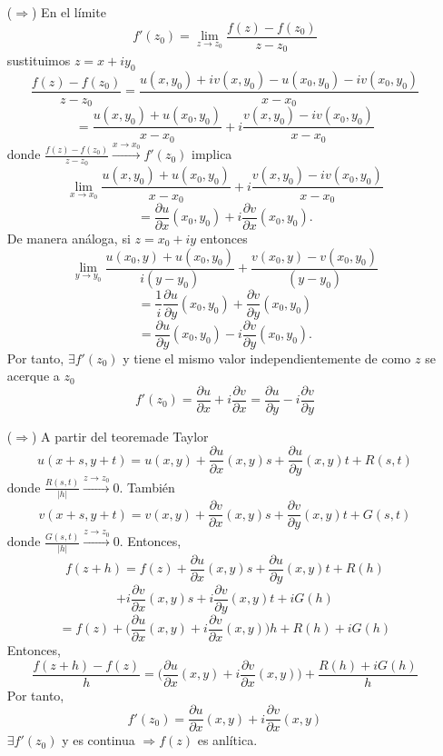 \begin{dem}
  \begin{enumerate}[label=(\roman*)]
    \item [($\Rightarrow$)] En el límite
      \[ 
        f'(z_{0}) = \lim_{z \to z_{0}} \frac{f(z) - f(z_{0})}{z - z_{0}}
      \] 
      sustituimos $z = x + iy_{0}$
      \[ 
        \frac{f(z) - f(z_{0})}{z - z_{0}} = \frac{u(x, y_{0}) + i v(x, y_{0}) - u(x_{0},y_{0}) - i v(x_{0}, y_{0})}{x - x_{0}}
      \]
      \[ 
      = \frac{u(x, y_{0}) +  u(x_{0}, y_{0})}{x - x_{0}} + i \frac{v(x,y_{0}) - i v(x_{0}, y_{0})}{x - x_{0}}
      \] 
      donde $\frac{f(z) - f(z_{0})}{z - z_{0}} \xrightarrow[]{x \rightarrow x_{0}} f'(z_{0})$ implica
      \[ 
        \lim_{x \to x_{0}} \frac{u(x, y_{0}) +  u(x_{0}, y_{0})}{x - x_{0}} + i \frac{v(x,y_{0}) - i v(x_{0}, y_{0})}{x - x_{0}} 
      \]
      \[ 
        = \frac{\partial{u}}{\partial{x}}(x_{0}, y_{0}) + i \frac{\partial{v}}{\partial{x}}(x_{0}, y_{0}).
      \] 
      De manera análoga, si $z = x_{0} + i y$ entonces
      \[ 
      \lim_{y \to y_{0}} \frac{u(x_{0}, y) +  u(x_{0}, y_{0})}{i(y - y_{0})} +  \frac{v(x_{0},y) -  v(x_{0}, y_{0})}{(y - y_{0})} 
      \]
      \[ = \frac{1}{i}\frac{\partial{u}}{\partial{y}}(x_{0}, y_{0}) + \frac{\partial{v}}{\partial{y}}(x_{0}, y_{0})
      \]
      \[ 
         = \frac{\partial{u}}{\partial{y}}(x_{0}, y_{0}) - i\frac{\partial{v}}{\partial{y}}(x_{0}, y_{0}).
      \] 
      Por tanto, $\exists f'(z_{0})$ y tiene el mismo valor independientemente de como $z$ se acerque a $z_{0}$
      \[ 
        f'(z_{0}) = \frac{\partial{u}}{\partial{x}} + i\frac{\partial{v}}{\partial{x}} =  \frac{\partial{u}}{\partial{y}} - i\frac{\partial{v}}{\partial{y}}
      \] 
    \item [($\Rightarrow$)] A partir del teoremade Taylor
      \[ 
        u(x + s, y + t) = u(x, y) + \frac{\partial{u}}{\partial{x}}(x, y)s + \frac{\partial{u}}{\partial{y}}(x, y)t + R(s, t) 
      \] 
      donde $\frac{R(s,t)}{| h |} \xrightarrow[]{ z \rightarrow z_{0}} 0 $. También
      \[ 
        v(x + s, y + t) = v(x, y) + \frac{\partial{v}}{\partial{x}}(x, y)s + \frac{\partial{v}}{\partial{y}}(x, y)t + G(s, t) 
      \] 
      donde $\frac{G(s,t)}{| h |} \xrightarrow[]{ z \rightarrow z_{0}} 0 $. Entonces,
      \[ 
         f(z + h) = f(z) + \frac{\partial{u}}{\partial{x}}(x, y)s + \frac{\partial{u}}{\partial{y}}(x, y)t + R(h) 
      \] 
      \[ 
        + i\frac{\partial{v}}{\partial{x}}(x, y)s + i\frac{\partial{v}}{\partial{y}}(x, y)t + iG(h) 
      \] 
      \[
        = f(z) + \Big ( \frac{\partial{u}}{\partial{x}}(x, y) + i\frac{\partial{v}}{\partial{x}}(x, y) \Big )h + R(h) + iG(h)
      \] 
      Entonces,
      \[ 
        \frac{f(z + h) - f(z)}{h} = \Big ( \frac{\partial{u}}{\partial{x}}(x, y) + i\frac{\partial{v}}{\partial{x}}(x, y) \Big ) + \frac{R(h) + iG(h)}{h}
      \] 
      Por tanto,
      \[ 
        f'(z_{0}) = \frac{\partial{u}}{\partial{x}}(x, y) + i \frac{\partial{v}}{\partial{x}}(x, y) 
      \] 
      $\exists f'(z_{0})$ y es continua $\Rightarrow f(z)$ es anlítica.
  \end{enumerate}
\end{dem}

